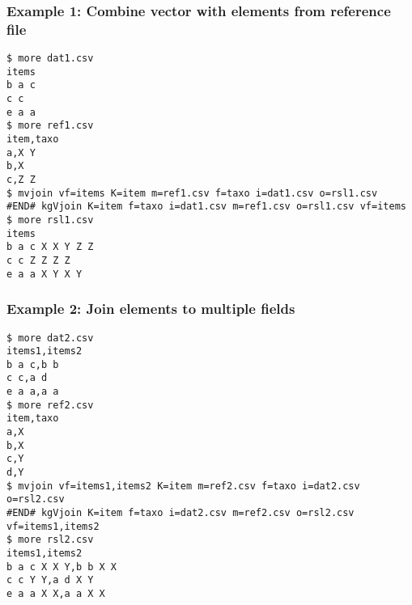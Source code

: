 \subsubsection*{Example 1: Combine vector with elements from reference file}



\begin{Verbatim}[baselinestretch=0.7,frame=single]
$ more dat1.csv
items
b a c
c c
e a a
$ more ref1.csv
item,taxo
a,X Y
b,X
c,Z Z
$ mvjoin vf=items K=item m=ref1.csv f=taxo i=dat1.csv o=rsl1.csv
#END# kgVjoin K=item f=taxo i=dat1.csv m=ref1.csv o=rsl1.csv vf=items
$ more rsl1.csv
items
b a c X X Y Z Z
c c Z Z Z Z
e a a X Y X Y
\end{Verbatim}
\subsubsection*{Example 2: Join elements to multiple fields}



\begin{Verbatim}[baselinestretch=0.7,frame=single]
$ more dat2.csv
items1,items2
b a c,b b
c c,a d
e a a,a a
$ more ref2.csv
item,taxo
a,X
b,X
c,Y
d,Y
$ mvjoin vf=items1,items2 K=item m=ref2.csv f=taxo i=dat2.csv o=rsl2.csv
#END# kgVjoin K=item f=taxo i=dat2.csv m=ref2.csv o=rsl2.csv vf=items1,items2
$ more rsl2.csv
items1,items2
b a c X X Y,b b X X
c c Y Y,a d X Y
e a a X X,a a X X
\end{Verbatim}
